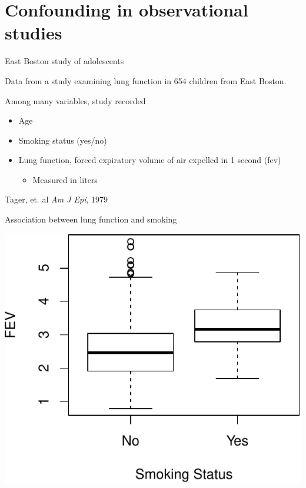 \documentclass[ignorenonframetext,]{beamer}
\begin{document}
\section{Confounding in observational
studies}\label{confounding-in-observational-studies}

\begin{frame}{East Boston study of adolescents}

Data from a study examining lung function in 654 children from East
Boston.

Among many variables, study recorded

\begin{itemize}
\item
  Age
\item
  Smoking status (yes/no)
\item
  Lung function, forced expiratory volume of air expelled in 1 second
  (fev)

  \begin{itemize}
  \itemsep1pt\parskip0pt
  \item
    Measured in liters
  \end{itemize}
\end{itemize}

Tager, et. al \textit{Am J Epi}, 1979

\end{frame}

\begin{frame}{Association between lung function and smoking}

\includegraphics{reporter_course_harrington_files/figure-beamer/unnamed-chunk-1-1.pdf}\\

\end{frame}
\end{document}
